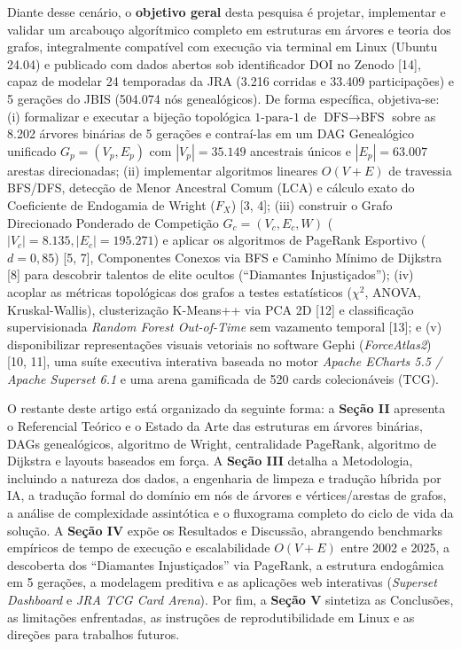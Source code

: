 \documentclass[conference]{IEEEtran}
\begin{document}
Diante desse cenário, o \textbf{objetivo geral} desta pesquisa é projetar, implementar e validar um arcabouço algorítmico completo em estruturas em árvores e teoria dos grafos, integralmente compatível com execução via terminal em Linux (Ubuntu 24.04) e publicado com dados abertos sob identificador DOI no Zenodo [14], capaz de modelar 24 temporadas da JRA (3.216 corridas e 33.409 participações) e 5 gerações do JBIS (504.074 nós genealógicos). De forma específica, objetiva-se: (i) formalizar e executar a bijeção topológica $1\text{-para-}1$ de $\text{DFS}\to\text{BFS}$ sobre as 8.202 árvores binárias de 5 gerações e contraí-las em um DAG Genealógico unificado $G_p = (V_p, E_p)$ com $|V_p| = 35.149$ ancestrais únicos e $|E_p| = 63.007$ arestas direcionadas; (ii) implementar algoritmos lineares $O(V + E)$ de travessia BFS/DFS, detecção de Menor Ancestral Comum (LCA) e cálculo exato do Coeficiente de Endogamia de Wright ($F_X$) [3, 4]; (iii) construir o Grafo Direcionado Ponderado de Competição $G_c = (V_c, E_c, W)$ ($|V_c| = 8.135, |E_c| = 195.271$) e aplicar os algoritmos de PageRank Esportivo ($d = 0,85$) [5, 7], Componentes Conexos via BFS e Caminho Mínimo de Dijkstra [8] para descobrir talentos de elite ocultos (``Diamantes Injustiçados''); (iv) acoplar as métricas topológicas dos grafos a testes estatísticos ($\chi^2$, ANOVA, Kruskal-Wallis), clusterização K-Means++ via PCA 2D [12] e classificação supervisionada \textit{Random Forest Out-of-Time} sem vazamento temporal [13]; e (v) disponibilizar representações visuais vetoriais no software Gephi (\textit{ForceAtlas2}) [10, 11], uma suíte executiva interativa baseada no motor \textit{Apache ECharts 5.5 / Apache Superset 6.1} e uma arena gamificada de 520 cards colecionáveis (TCG).

O restante deste artigo está organizado da seguinte forma: a \textbf{Seção II} apresenta o Referencial Teórico e o Estado da Arte das estruturas em árvores binárias, DAGs genealógicos, algoritmo de Wright, centralidade PageRank, algoritmo de Dijkstra e layouts baseados em força. A \textbf{Seção III} detalha a Metodologia, incluindo a natureza dos dados, a engenharia de limpeza e tradução híbrida por IA, a tradução formal do domínio em nós de árvores e vértices/arestas de grafos, a análise de complexidade assintótica e o fluxograma completo do ciclo de vida da solução. A \textbf{Seção IV} expõe os Resultados e Discussão, abrangendo benchmarks empíricos de tempo de execução e escalabilidade $O(V + E)$ entre 2002 e 2025, a descoberta dos ``Diamantes Injustiçados'' via PageRank, a estrutura endogâmica em 5 gerações, a modelagem preditiva e as aplicações web interativas (\textit{Superset Dashboard} e \textit{JRA TCG Card Arena}). Por fim, a \textbf{Seção V} sintetiza as Conclusões, as limitações enfrentadas, as instruções de reprodutibilidade em Linux e as direções para trabalhos futuros.
\end{document}
